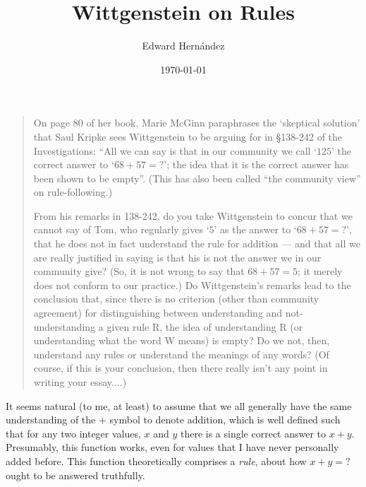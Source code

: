 \documentclass[doc,12pt,apacite,biblatex]{apa6}
\begin{document}
 \title{Wittgenstein on Rules}
\author{Edward Hern\'{a}ndez}
\date{\today}

\maketitle

\vspace{-20pt}
\begin{quote}
	On page 80 of her book, Marie McGinn paraphrases the `skeptical solution'
	that Saul Kripke sees Wittgenstein to be arguing for in \S 138-242 of the
	Investigations: ``All we can say is that in our community we call `$125$'
	the correct answer to `$68 + 57 = ?$'; the idea that it is the correct
	answer has been shown to be empty''. (This has also been called ``the
	community view'' on rule-following.)
	
	From his remarks in 138-242, do you take Wittgenstein to concur that we
	cannot say of Tom, who regularly gives `$5$' as the answer to `$68 + 57 =
	?$', that he does not in fact understand the rule for addition --- and that
	all we are really justified in saying is that his is not the answer we in
	our community give?  (So, it is not wrong to say that $68 + 57 = 5$; it
	merely does not conform to our practice.)  Do Wittgenstein's remarks lead
	to the conclusion that, since there is no criterion (other than community
	agreement) for distinguishing between understanding and not-understanding a
	given rule R, the idea of understanding R (or understanding what the word W
	means) is empty?  Do we not, then, understand any rules or understand the
	meanings of any words?  (Of course, if this is your conclusion, then there
	really isn't any point in writing your essay....)
\end{quote}
\clearpage

It seems natural (to me, at least) to assume that we all generally have the
same understanding of the $+$ symbol to denote addition, which is well defined
such that for any two integer values, $x$ and $y$ there is a single correct
answer to $x + y$. Presumably, this function works, even for values that I have
never personally added before. This function theoretically comprises a
\emph{rule}, about how $x + y = ?$ ought to be answered truthfully.
\end{document}
